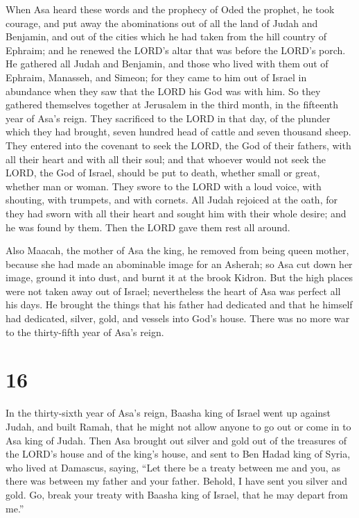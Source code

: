  When Asa heard these words and the prophecy of Oded the
prophet, he took courage, and put away the abominations out of all the
land of Judah and Benjamin, and out of the cities which he had taken
from the hill country of Ephraim; and he renewed the LORD's altar that
was before the LORD's porch.  He gathered all Judah and
Benjamin, and those who lived with them out of Ephraim, Manasseh, and
Simeon; for they came to him out of Israel in abundance when they saw
that the LORD his God was with him.  So they gathered
themselves together at Jerusalem in the third month, in the fifteenth
year of Asa's reign.  They sacrificed to the LORD in that
day, of the plunder which they had brought, seven hundred head of cattle
and seven thousand sheep.  They entered into the covenant
to seek the LORD, the God of their fathers, with all their heart and
with all their soul;  and that whoever would not seek the
LORD, the God of Israel, should be put to death, whether small or great,
whether man or woman.  They swore to the LORD with a loud
voice, with shouting, with trumpets, and with cornets.  All
Judah rejoiced at the oath, for they had sworn with all their heart and
sought him with their whole desire; and he was found by them. Then the
LORD gave them rest all around.

 Also Maacah, the mother of Asa the king, he removed from
being queen mother, because she had made an abominable image for an
Asherah; so Asa cut down her image, ground it into dust, and burnt it at
the brook Kidron.  But the high places were not taken away
out of Israel; nevertheless the heart of Asa was perfect all his days.
 He brought the things that his father had dedicated and
that he himself had dedicated, silver, gold, and vessels into God's
house.  There was no more war to the thirty-fifth year of
Asa's reign.

\hypertarget{section-15}{%
\section{16}\label{section-15}}

 In the thirty-sixth year of Asa's reign, Baasha king of
Israel went up against Judah, and built Ramah, that he might not allow
anyone to go out or come in to Asa king of Judah.  Then Asa
brought out silver and gold out of the treasures of the LORD's house and
of the king's house, and sent to Ben Hadad king of Syria, who lived at
Damascus, saying,  ``Let there be a treaty between me and
you, as there was between my father and your father. Behold, I have sent
you silver and gold. Go, break your treaty with Baasha king of Israel,
that he may depart from me.''

